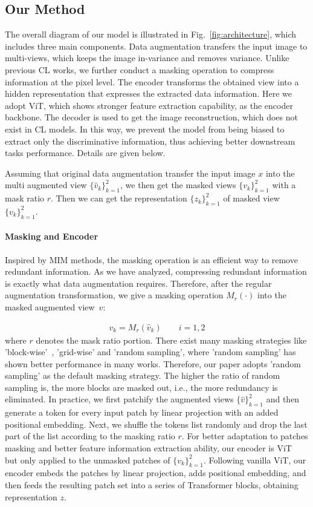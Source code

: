 \documentclass[10pt,twocolumn,letterpaper]{article}
\begin{document}
\subsection{Our Method}
The overall diagram of our model is illustrated in Fig.~\ref{fig:architecture}, which includes three main components. Data augmentation transfers the input image to multi-views, which keeps the image in-variance and removes variance. Unlike previous CL works, we further conduct a masking operation to compress information at the pixel level. The encoder transforms the obtained view into a hidden representation that expresses the extracted data information. Here we adopt ViT, which shows stronger feature extraction capability, as the encoder backbone. The decoder is used to get the image reconstruction, which does not exist in CL models. In this way, we prevent the model from being biased to extract only the discriminative information, thus achieving better downstream tasks performance. Details are given below.


Assuming that original data augmentation transfer the input image $x$ into the multi augmented view $\{\hat{v}_k\}_{k=1}^2$, we then get the masked views $\{v_k\}_{k=1}^2$ with a mask ratio $r$. Then we can get the representation $\{z_k\}_{k=1}^2$ of masked view $\{v_k\}_{k=1}^2$.
\paragraph{Masking and Encoder}
Inspired by MIM methods, the masking operation is an efficient way to remove redundant information. As we have analyzed, compressing redundant information is exactly what data augmentation requires. Therefore, after the regular augmentation transformation, we give a masking operation $M_r(\cdot)$ into the masked augmented view~$v$:

\begin{align}
    v_k = M_r(\hat{v}_k) \qquad  i=1,2
\end{align}
where $r$ denotes the mask ratio portion. There exist many masking strategies like 'block-wise'~\cite{bao2021beit}, 'grid-wise' and 'random sampling', where 'random sampling' has shown better performance in many works. Therefore, our paper adopts 'random sampling' as the default masking strategy. The higher the ratio of random sampling is, the more blocks are masked out, i.e., the more redundancy is eliminated. In practice, we first patchify the augmented views $\{\hat{v}\}_{k=1}^2$ and then generate a token for every input patch by linear projection with an added positional embedding. Next, we shuffle the tokens list randomly and drop the last part of the list according to the masking ratio $r$.
For better adaptation to patches masking and better feature information extraction ability, our encoder is ViT~\cite{dosovitskiy2020image} but only applied to the unmasked patches of $\{v_k\}_{k=1}^2$. Following vanilla ViT, our encoder embeds the patches by linear projection, adds positional embedding, and then feeds the resulting patch set into a series of Transformer blocks, obtaining representation $z$.
\end{document}
